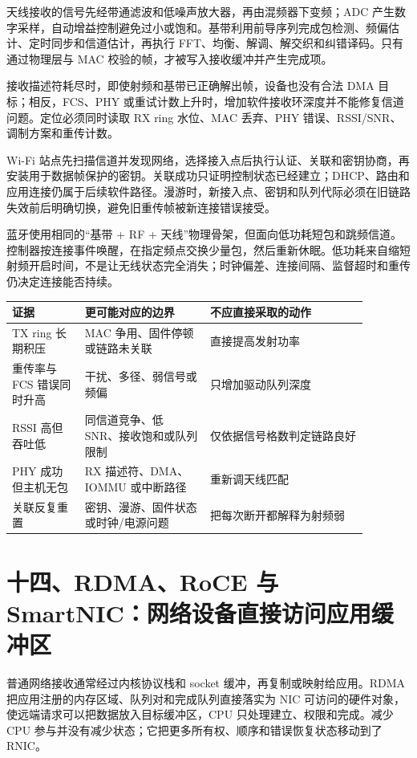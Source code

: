
天线接收的信号先经带通滤波和低噪声放大器，再由混频器下变频；ADC 产生数字采样，自动增益控制避免过小或饱和。基带利用前导序列完成包检测、频偏估计、定时同步和信道估计，再执行 FFT、均衡、解调、解交织和纠错译码。只有通过物理层与 MAC 校验的帧，才被写入接收缓冲并产生完成项。

接收描述符耗尽时，即使射频和基带已正确解出帧，设备也没有合法 DMA 目标；相反，FCS、PHY 或重试计数上升时，增加软件接收环深度并不能修复信道问题。定位必须同时读取 RX ring 水位、MAC 丢弃、PHY 错误、RSSI/SNR、调制方案和重传计数。


Wi-Fi 站点先扫描信道并发现网络，选择接入点后执行认证、关联和密钥协商，再安装用于数据帧保护的密钥。关联成功只证明控制状态已经建立；DHCP、路由和应用连接仍属于后续软件路径。漫游时，新接入点、密钥和队列代际必须在旧链路失效前后明确切换，避免旧重传帧被新连接错误接受。

蓝牙使用相同的“基带 + RF + 天线”物理骨架，但面向低功耗短包和跳频信道。控制器按连接事件唤醒，在指定频点交换少量包，然后重新休眠。低功耗来自缩短射频开启时间，不是让无线状态完全消失；时钟偏差、连接间隔、监督超时和重传仍决定连接能否持续。

\begin{longtable}{L{0.18\linewidth}L{0.31\linewidth}L{0.39\linewidth}}
\toprule
证据 & 更可能对应的边界 & 不应直接采取的动作 \\
\midrule
TX ring 长期积压 & MAC 争用、固件停顿或链路未关联 & 直接提高发射功率 \\\tablerowrule
重传率与 FCS 错误同时升高 & 干扰、多径、弱信号或频偏 & 只增加驱动队列深度 \\\tablerowrule
RSSI 高但吞吐低 & 同信道竞争、低 SNR、接收饱和或队列限制 & 仅依据信号格数判定链路良好 \\\tablerowrule
PHY 成功但主机无包 & RX 描述符、DMA、IOMMU 或中断路径 & 重新调天线匹配 \\\tablerowrule
关联反复重置 & 密钥、漫游、固件状态或时钟/电源问题 & 把每次断开都解释为射频弱 \\
\bottomrule
\end{longtable}

\section{十四、RDMA、RoCE 与 SmartNIC：网络设备直接访问应用缓冲区}

普通网络接收通常经过内核协议栈和 socket 缓冲，再复制或映射给应用。RDMA 把应用注册的内存区域、队列对和完成队列直接落实为 NIC 可访问的硬件对象，使远端请求可以把数据放入目标缓冲区，CPU 只处理建立、权限和完成。减少 CPU 参与并没有减少状态；它把更多所有权、顺序和错误恢复状态移动到了 RNIC。

